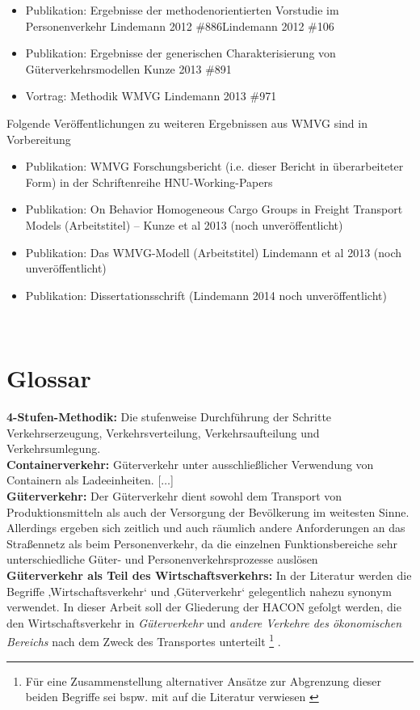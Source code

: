 \begin{itemize}
%
   \item Publikation: Ergebnisse der methodenorientierten Vorstudie im Personenverkehr {Lindemann 2012 \#886}{Lindemann 2012 \#106}
   \item Publikation: Ergebnisse der generischen Charakterisierung von Güterverkehrsmodellen {Kunze 2013 \#891}
   \item Vortrag: Methodik WMVG {Lindemann 2013 \#971}
%
\end{itemize}
Folgende Veröffentlichungen zu weiteren Ergebnissen aus WMVG sind in Vorbereitung~\\

\begin{itemize}
%
   \item Publikation: WMVG Forschungsbericht (i.e. dieser Bericht in überarbeiteter Form) in der Schriftenreihe HNU-Working-Papers
   \item Publikation: On Behavior Homogeneous Cargo Groups in Freight Transport Models (Arbeitstitel) – Kunze et al 2013 (noch unveröffentlicht)
   \item Publikation: Das WMVG-Modell (Arbeitstitel) Lindemann et al 2013 (noch unveröffentlicht)
   \item Publikation: Dissertationsschrift (Lindemann 2014 noch unveröffentlicht)
%
\end{itemize}

\label{_Toc366766130}
\label{_Toc365801620}
\newpage
~\\

% 
\section*{Glossar }\textbf{4-Stufen-Methodik: }Die stufenweise Durchführung der Schritte Verkehrserzeugung, Verkehrsverteilung, Verkehrsaufteilung und Verkehrsumlegung.~\\
\textbf{Containerverkehr}\textbf{:} \glqq Güterverkehr unter ausschließlicher Verwendung von Containern als Ladeeinheiten. [$\ldots$]\grqq   \autocites[][]{bib.372}~\\
\textbf{Güterverkehr}\textbf{:} \glqq Der Güterverkehr dient sowohl dem Transport von Produktionsmitteln als auch der Versorgung der Bevölkerung im weitesten Sinne. Allerdings ergeben sich zeitlich und auch räumlich andere Anforderungen an das Straßennetz als beim Personenverkehr, da die einzelnen Funktionsbereiche sehr unterschiedliche Güter- und Personenverkehrsprozesse auslösen\grqq   \autocites[][]{bib.213}~\\
\textbf{Güterverkehr als Teil des Wirtschaftsverkehrs}\textbf{:} In der Literatur werden die Begriffe ‚Wirtschaftsverkehr‘ und ‚Güterverkehr‘ gelegentlich nahezu synonym verwendet. In dieser Arbeit soll der Gliederung der HACON gefolgt werden, die den Wirtschaftsverkehr in \emph{Güterverkehr} und \emph{andere Verkehre des öko}\emph{no}\emph{mischen Bereichs} nach dem Zweck des Transportes unterteilt  \autocites[][]{bib.879}\footnote{%
 Für eine Zusammenstellung alternativer Ansätze zur Abgrenzung dieser beiden Begriffe sei bspw. mit  \citeauthor{bib.820} auf die Literatur verwiesen  \autocites[][]{bib.820}
}%
.~\\

